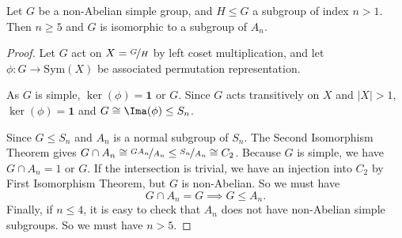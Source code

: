 \begin{theorem}
    Let \(G\) be a non-Abelian simple group, and \(H\leq G\) a subgroup of index \(n>1\). Then \(n\geq 5\) and \(G\) is isomorphic to a subgroup of \(A_n\).
\end{theorem}
\begin{proof}
    Let \(G\) act on \(X = \nicefrac{G}{H}\) by left coset multiplication, and let \(\phi:G \to \mathrm{Sym}(X)\) be associated permutation representation.

    As \(G\) is simple, \(\ker(\phi)=\mathbf{1} \text{ or } G\). Since \(G\) acts transitively on \(X\) and \(\left\vert X \right\vert >1\), \(\ker(\phi) = \textbf{1} \) and \(G \cong \Ima(\phi)\leq S_n\).

    Since \(G \leq S_n\) and \(A_n\) is a normal subgroup of \(S_n\). The Second Isomorphism Theorem gives \( G\cap A_n\cong \nicefrac{GA_n}{A_n} \leq \nicefrac{S_n}{A_n} \cong C_2 \). Because \(G\) is simple, we have \(G\cap A_{n} = 1 \text{ or } G\). If the intersection is trivial, we have an injection into \(C_2\) by First Isomorphism Theorem, but \(G\) is non-Abelian. So we must have
    \[
        G\cap A_n = G \implies G \leq A_n.
    \]
    Finally, if \(n\leq 4\), it is easy to check that \(A_n\) does not have non-Abelian simple subgroups. So we must have \(n > 5\).
\end{proof}